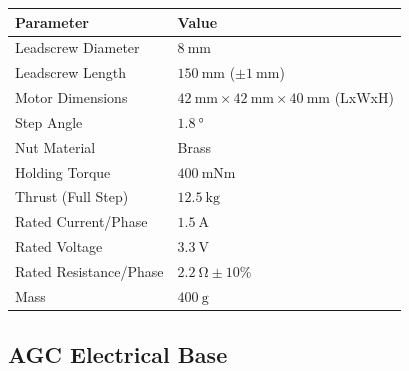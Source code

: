 \documentclass[11pt,landscape]{article}
\begin{document}
\begin{multicols}{3}
\begin{table}[H]
    \begin{center}
        \begin{tabular}{|l|l|}
            \hline
            \textbf{Parameter}     & \textbf{Value}          \\ \hline 
            Leadscrew Diameter     & $\SI{8}{\mm}$                  \\ \hline
            Leadscrew Length       & $\SI{150}{\mm}$ ($\pm\SI{1}{\mm}$)        \\ \hline
            Motor Dimensions       & $\SI{42}{\mm}\times\SI{42}{\mm}\times\SI{40}{\mm}$ (LxWxH) \\ \hline
            Step Angle             & $\SI{1.8}{\degree}$           \\ \hline
            Nut Material           & Brass                   \\ \hline
            Holding Torque         & $\SI{400}{\mN\m}$                \\ \hline
            Thrust (Full Step)     & $\SI{12.5}{\kg}$              \\ \hline
            Rated Current/Phase    & $\SI{1.5}{\ampere}$      \\ \hline
            Rated Voltage          & $\SI{3.3}{\volt}$     \\ \hline
            Rated Resistance/Phase &$\SI{2.2}{\ohm}\pm10$\%  \\ \hline
            Mass                   & $\SI{400}{\gram}$                  \\ \hline
        \end{tabular}
    \end{center}
\end{table}

\subsection{AGC Electrical Base}

\end{multicols}
\end{document}
